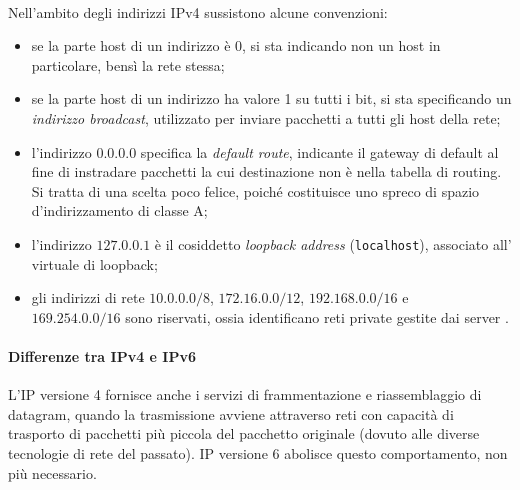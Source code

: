 \documentclass[a4paper,11pt]{article}
\def\code#1{\texttt{#1}}
\def\vedi#1{\nameref{#1}}
\begin{document}
\ \\Nell'ambito degli indirizzi IPv4 sussistono alcune convenzioni:
\begin{itemize}
\item se la parte host di un indirizzo è 0, si sta indicando non un host in particolare, bensì la rete stessa;
\item se la parte host di un indirizzo ha valore 1 su tutti i bit, si sta specificando un \textit{indirizzo broadcast}, utilizzato per inviare pacchetti a tutti gli host della rete;
\item l'indirizzo $0.0.0.0$ specifica la \textit{default route}, indicante il gateway di default al fine di instradare pacchetti la cui destinazione non è nella tabella di routing. Si tratta di una scelta poco felice, poiché costituisce uno spreco di spazio d'indirizzamento di classe A;
\item l'indirizzo $127.0.0.1$ è il cosiddetto \textit{loopback address} (\code{localhost}), associato all'\vedi{Interfaccia di rete} virtuale di loopback;
\item gli indirizzi di rete $10.0.0.0/8$, $172.16.0.0/12$, $192.168.0.0/16$ e\\ $169.254.0.0/16$ sono riservati, ossia identificano reti private gestite dai server \vedi{NAT}.
\end{itemize}

\paragraph{Differenze tra IPv4 e IPv6}
L’IP versione 4 fornisce anche i servizi di frammentazione e riassemblaggio di datagram, quando la trasmissione avviene attraverso reti con capacità di trasporto di pacchetti più piccola del pacchetto originale (dovuto alle diverse tecnologie di rete del passato). IP versione 6 abolisce questo comportamento, non più necessario. %
\end{document}
